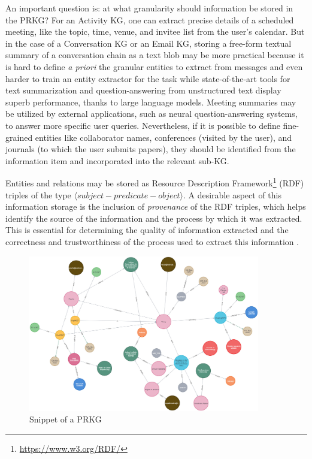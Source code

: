 \documentclass[11pt,pdftex]{article}
\begin{document}
An important question is: at what granularity should information be stored in the PRKG? For an Activity KG, one can extract precise details of a scheduled meeting, like the topic, time, venue, and invitee list from the user's calendar. But in the case of a Conversation KG or an Email KG, storing a free-form textual summary of a conversation chain as a text blob may be more practical because it is hard to define \textit{a priori} the granular entities to extract from messages and even harder to train an entity extractor for the task while state-of-the-art tools for text summarization and question-answering from unstructured text display superb performance, thanks to large language models. Meeting summaries may be utilized by external applications, such as neural question-answering systems, to answer more specific user queries. Nevertheless, if it is possible to define fine-grained entities like collaborator names, conferences (visited by the user), and journals (to which the user submits papers), they should be identified from the information item and incorporated into the relevant sub-KG. 

Entities and relations may be stored as Resource Description Framework\footnote{\url{https://www.w3.org/RDF/}} \cite{miller1998rdf} (RDF) triples of the type $ \langle subject-predicate-object \rangle $. A desirable aspect of this information storage is the inclusion of \textit{provenance} of the RDF triples, which helps identify the source of the information and the process by which it was extracted. This is essential for determining the quality of information extracted and the correctness and trustworthiness of the process used to extract this information \cite{sikos2020provenance}.

\begin{figure}[!htbp]
    \centering
    \includegraphics[width=0.9\textwidth]{submissions/Sudakshina2023/figs/PRKG_new.jpg}
    \caption{Snippet of a PRKG}
    \label{fig:prkg}
\end{figure}
\end{document}
